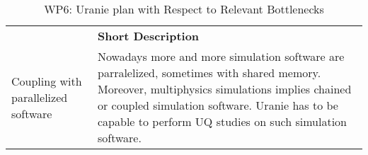 \begin{table}[h!]
    \centering



    \centering
    { 
        \setlength{\parindent}{0pt}
        \def\arraystretch{1.25}
        {
            \fontsize{9}{11}\selectfont
            \begin{tabular}{!{\color{numpexgray}\vrule}p{.25\linewidth}!{\color{numpexgray}\vrule}p{.6885\linewidth}!{\color{numpexgray}\vrule}}

     &  {\rule{0pt}{2.5ex}\color{white}\bf Short Description }\\ 

 Coupling with parallelized software  & Nowadays more and more simulation software are parralelized, sometimes with shared memory. Moreover, multiphysics simulations implies chained or coupled simulation software. Uranie has to be capable to perform UQ studies on such simulation software. \\
\end{tabular}
        }
    }
    \caption{WP6: Uranie plan with Respect to Relevant Bottlenecks}
    \label{tab:WP6:Uranie:bottlenecks}
\end{table}

